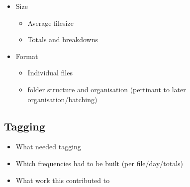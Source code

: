 \begin{itemize}
    \item Size
        \begin{itemize}
            \item Average filesize
            \item Totals and breakdowns
        \end{itemize}
    \item Format
        \begin{itemize}
            \item Individual files
            \item folder structure and organisation (pertinant to later organisation/batching)
        \end{itemize}
\end{itemize}


\subsection{Tagging}
\begin{itemize}
    \item What needed tagging
    \item Which frequencies had to be built (per file/day/totals)
    \item What work this contributed to
\end{itemize}
